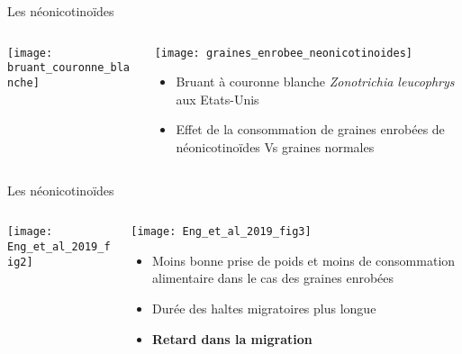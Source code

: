 \documentclass[10pt]{beamer}
\begin{document}
\begin{frame}{Les néonicotinoïdes}
 \begin{columns}[c]
    \begin{column}[c]{0.5\textwidth}
     \begin{center}
     \texttt{[image: bruant\_couronne\_blanche]}
      \end{center}
\begin{tiny}
        \vspace{10pt}
    \cite{Eng2019}
  \end{tiny}
    \end{column}
    \begin{column}[c]{0.5\textwidth}
      
     \texttt{[image: graines\_enrobee\_neonicotinoides]}
    
       \begin{itemize}
		\item Bruant à couronne blanche \textit{Zonotrichia leucophrys} aux Etats-Unis
		\item Effet de la consommation de graines enrobées de néonicotinoïdes Vs graines normales
	\end{itemize}
    \end{column}
  \end{columns}

\end{frame}



\begin{frame}{Les néonicotinoïdes}
 \begin{columns}[c]
    \begin{column}[c]{0.6\textwidth}
\begin{center}
     \texttt{[image: Eng\_et\_al\_2019\_fig2]}
      \end{center}
       \begin{tiny}
        \vspace{10pt}
    \cite{Eng2019}
  \end{tiny}
    \end{column}
    \begin{column}[c]{0.4\textwidth}
      \begin{center}
     \texttt{[image: Eng\_et\_al\_2019\_fig3]}
      \end{center}
\begin{footnotesize}
      \begin{itemize}
\item Moins bonne prise de poids et moins de consommation alimentaire dans le cas des graines enrobées
\item Durée des haltes migratoires plus longue
\item \textbf{Retard dans la migration}
	\end{itemize}
  \end{footnotesize}


    \end{column}
  \end{columns}
\end{frame}
\end{document}
